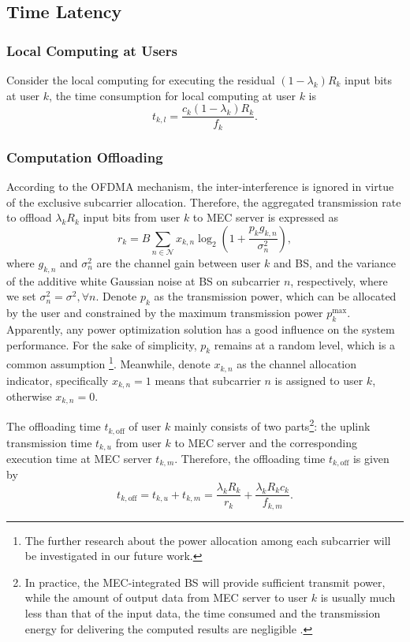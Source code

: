 \documentclass[journal]{IEEEtran}
\begin{document}
    \subsection{Time Latency}
    \subsubsection{Local Computing at Users}
    Consider the local computing for executing the residual $(1-\lambda_k)R_k$ input bits at user $k$, the time consumption for local computing at user $k$ is
    \begin{equation}
        \label{local time}
        t_{k,l} =\frac{c_{k}\left(1-\lambda_{k}\right)R_{k}}{f_{k}}.
    \end{equation}
    \subsubsection{Computation Offloading}
    According to the OFDMA mechanism, the inter-interference is ignored in virtue of the exclusive subcarrier allocation. Therefore, the aggregated transmission rate to offload $\lambda_kR_k$ input bits from user $k$ to MEC server is expressed as
    \begin{equation}
        \label{r_k}
        r_k =B\sum_{n\in\mathcal{N}}x_{k,n}\log_2\left(1+\frac{p_{k}g_{k,n}}{\sigma_n^2}\right),
    \end{equation}
    where $g_{k,n}$ and $\sigma_n^2$ are the channel gain between user $k$ and BS, and the variance of the additive white Gaussian noise at BS on subcarrier $n$, respectively, where we set $\sigma_n^2=\sigma^2, \forall n$. Denote $p_{k}$ as the transmission power, which can be allocated by the user and constrained by the maximum transmission power $p_k^\text{max}$. Apparently, any power optimization solution has a good influence on the system performance. For the sake of simplicity, $p_k$ remains at a random level, which is a common assumption \cite{Yang2019Access,wenJoint}\footnote{The further research about the power allocation among each subcarrier will be investigated in our future work.}. Meanwhile, denote $x_{k,n}$ as the channel allocation indicator, specifically $x_{k,n}=1$ means that subcarrier $n$ is assigned to user $k$, otherwise $x_{k,n}=0$.

    The offloading time $t_{k,\text{off}}$ of user $k$ mainly consists of two parts\footnote{In practice, the MEC-integrated BS will provide sufficient transmit power, while the amount of output data from MEC server to user $k$ is usually much less than that of the input data, the time consumed and the transmission energy for delivering the computed results are negligible \cite{Hu2018Wireless}.\label{footnote1}}: the uplink transmission time $t_{k,u}$ from user $k$ to MEC server and the corresponding execution time at MEC server $t_{k,m}$. Therefore, the offloading time $t_{k,\text{off}}$ is given by
    \begin{equation}
        \label{t_off}
        t_{k,\text{off}}=t_{k,u}+t_{k,m}=\frac{\lambda_{k}R_{k}}{r_{k}}+\frac{\lambda_{k}R_{k}c_{k}}{f_{k,m}}.
    \end{equation}
\end{document}
